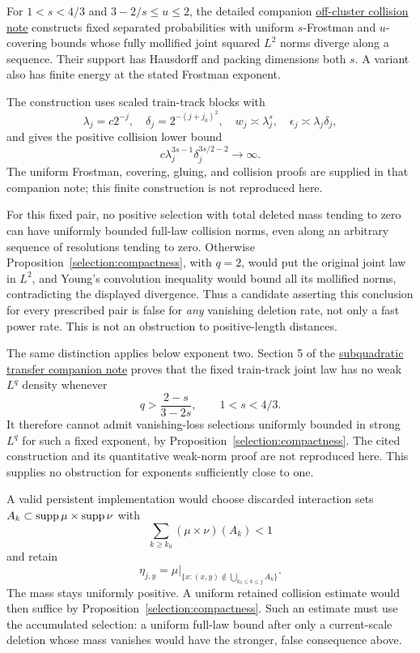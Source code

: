 \begin{remark}
\label{selection:false-candidate}
For \(1<s<4/3\) and \(3-2/s\le u\le2\), the detailed companion
\href{https://github.com/CoolRmal/falconer-packing/blob/main/docs/packing-unforced/2026-09-30-off-cluster-collision-obstruction.md}
{off-cluster collision note} constructs fixed separated probabilities with
uniform \(s\)-Frostman and \(u\)-covering bounds whose fully mollified
joint squared \(L^2\) norms diverge along a sequence. Their support has
Hausdorff and packing dimensions both \(s\). A variant also has finite
energy at the stated Frostman exponent.

The construction uses scaled train-track blocks with
\[
 \lambda_j=c2^{-j},\quad \delta_j=2^{-(j+j_0)^2},\quad
 w_j\asymp\lambda_j^s,\quad \epsilon_j\asymp\lambda_j\delta_j,
\]
and gives the positive collision lower bound
\[
 c\lambda_j^{3s-1}\delta_j^{3s/2-2}\longrightarrow\infty.
\]
The uniform Frostman, covering, gluing, and collision proofs are supplied
in that companion note; this finite construction is not reproduced here.

For this fixed pair, no positive selection with total deleted mass tending
to zero can have uniformly bounded full-law collision norms, even along an
arbitrary sequence of resolutions tending to zero. Otherwise
Proposition~\ref{selection:compactness}, with \(q=2\), would put the original joint law
in \(L^2\), and Young's convolution inequality would bound all its
mollified norms, contradicting the displayed divergence. Thus a candidate
asserting this conclusion for every prescribed pair is false for \emph{any}
vanishing deletion rate, not only a fast power rate. This is not an
obstruction to positive-length distances.
\end{remark}

The same distinction applies below exponent two. Section 5 of the
\href{https://github.com/CoolRmal/falconer-packing/blob/main/docs/packing-unforced/2026-09-30-subquadratic-profile-transfer.md}
{subquadratic transfer companion note} proves that the fixed train-track
joint law has no weak \(L^q\) density whenever
\[
 q>\frac{2-s}{3-2s},\qquad 1<s<4/3.
\]
It therefore cannot admit vanishing-loss selections uniformly bounded in
strong \(L^q\) for such a fixed exponent, by
Proposition~\ref{selection:compactness}. The cited construction and its
quantitative weak-norm proof are not reproduced here. This supplies no
obstruction for exponents sufficiently close to one.

A valid persistent implementation would choose discarded interaction sets
\(A_k\subset\operatorname{supp}\mu\times\operatorname{supp}\nu\) with
\[
 \sum_{k\ge k_0}(\mu\times\nu)(A_k)<1
\]
and retain
\[
 \eta_{j,y}=\mu\big|_{\{x:(x,y)\notin\bigcup_{k_0\le k\le j}A_k\}}.
\]
The mass stays uniformly positive. A uniform retained collision estimate
would then suffice by Proposition~\ref{selection:compactness}. Such an
estimate must use the accumulated selection: a uniform full-law bound after
only a current-scale deletion whose mass vanishes would have the stronger,
false consequence above.


